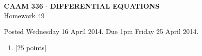 \documentclass[10pt]{article}
\begin{document}
\vspace*{-5em}
\begin{center}
\large \textsf{\textbf{CAAM 336 $\cdot$ DIFFERENTIAL EQUATIONS}\\[0.5em]
Homework 49 }
\end{center}

Posted Wednesday 16 April 2014.  Due 1pm Friday 25 April 2014.

\begin{enumerate}\addtocounter{enumi}{48}
\item {[25 points]}  
\end{enumerate}
\end{document}
